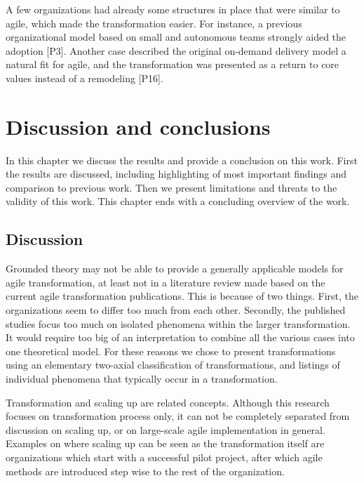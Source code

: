 
A few organizations had already some structures in place that were similar to
agile, which made the transformation easier.
For instance, a previous organizational model based on small and autonomous
teams strongly aided the adoption [P3].
Another case described the original on-demand delivery model a natural fit for
agile, and the transformation was presented as a return to core values instead
of a remodeling [P16].


\clearpage

\chapter{Discussion and conclusions}
\label{sec:discussion}

In this chapter we discuss the results and provide a conclusion on this work.
First the results are discussed, including highlighting of most important
findings and comparison to previous work. Then we present limitations and
threats to the validity of this work. This chapter ends with a concluding
overview of the work.

\section{Discussion}


Grounded theory may not be able to provide a generally applicable models for
agile transformation, at least not in a literature review made based on the
current agile transformation publications. This is because of two things.
First, the organizations seem to differ too much from each other. Secondly, the
published studies focus too much on isolated phenomena within the larger
transformation.
It would require too big of an interpretation to combine all the various cases
into one theoretical model. For these reasons we chose to present
transformations using an elementary two-axial classification of transformations,
and listings of individual phenomena that typically occur in a transformation.


Transformation and scaling up are related concepts. Although this research
focuses on transformation process only, it can not be completely separated from
discussion on scaling up, or on large-scale agile implementation in general.
Examples on where scaling up can be seen as the transformation itself are
organizations which start with a successful pilot project, after which agile
methods are introduced step wise to the rest of the organization.

